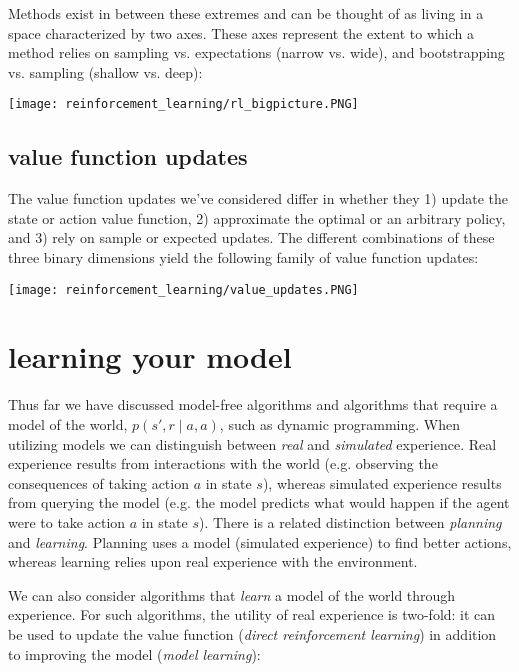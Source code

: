 Methods exist in between these extremes and can be thought of as living in a space characterized by two axes. These axes represent the extent to which a method relies on sampling vs. expectations (narrow vs. wide), and bootstrapping vs. sampling (shallow vs. deep): 

\begin{center}\texttt{[image: reinforcement\_learning/rl\_bigpicture.PNG]}\end{center}

\subsection{value function updates}
The value function updates we've considered differ in whether they 1) update the state or action value function, 2) approximate the optimal or an arbitrary policy, and 3) rely on sample or expected updates. The different combinations of these three binary dimensions yield the following family of value function updates: 

\begin{center}\texttt{[image: reinforcement\_learning/value\_updates.PNG]}\end{center}

\section{learning your model}
Thus far we have discussed model-free algorithms and algorithms that require a model of the world, $p(s',r \mid a,a)$, such as dynamic programming. When utilizing models we can distinguish between \textit{real} and \textit{simulated} experience. Real experience results from interactions with the world (e.g. observing the consequences of taking action $a$ in state $s$), whereas simulated experience results from querying the model (e.g. the model predicts what would happen if the agent were to take action $a$ in state $s$). There is a related distinction between \textit{planning} and \textit{learning}. Planning uses a model (simulated experience) to find better actions, whereas learning relies upon real experience with the environment.

We can also consider algorithms that \textit{learn} a model of the world through experience. For such algorithms, the utility of real experience is two-fold: it can be used to update the value function (\textit{direct reinforcement learning}) in addition to improving the model (\textit{model learning}):

